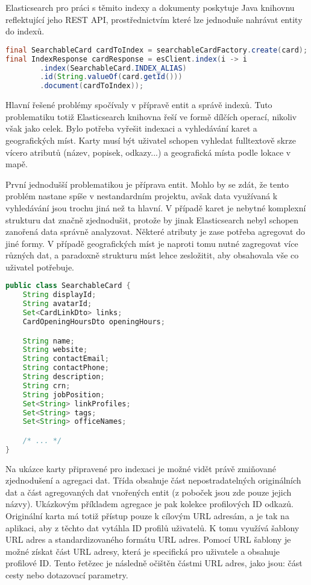 		Elasticsearch pro práci s těmito indexy a dokumenty poskytuje Java knihovnu reflektující jeho \ac{REST} \ac{API},
		prostřednictvím které lze jednoduše nahrávat entity do indexů.

		\begin{lstlisting}[language=Java, caption={Indexace jedné karty do Elasticsearch databáze. Zdroj: [autor]}]
final SearchableCard cardToIndex = searchableCardFactory.create(card);
final IndexResponse cardResponse = esClient.index(i -> i
		.index(SearchableCard.INDEX_ALIAS)
		.id(String.valueOf(card.getId()))
		.document(cardToIndex));
		\end{lstlisting}

		Hlavní řešené problémy spočívaly v přípravě entit a správě indexů.
		Tuto problematiku totiž Elasticsearch knihovna řeší ve formě dílčích operací, nikoliv však jako celek.
		Bylo potřeba vyřešit indexaci a vyhledávání karet a geografických míst.
		Karty musí být uživatel schopen vyhledat fulltextově skrze vícero atributů (název, popisek, odkazy...) a geografická
		místa podle lokace v mapě.

		První jednodušší problematikou je příprava entit.
		Mohlo by se zdát, že tento problém nastane spíše v nestandardním projektu, avšak data využívaná k vyhledávání
		jsou trochu jiná než ta hlavní.
		V případě karet je nebytné komplexní strukturu dat značně zjednodušit, protože by jinak Elasticsearch
		nebyl schopen zanořená data správně analyzovat.
		Některé atributy je zase potřeba agregovat do jiné formy.
		V případě geografických míst je naproti tomu nutné zagregovat více různých dat, a paradoxně strukturu míst lehce
		zesložitit, aby obsahovala vše co uživatel potřebuje.

		\begin{lstlisting}[language=Java, caption={Indexovatelná karta. Obsahuje metadata a vyhledatelná data. Zdroj: [autor]}]
public class SearchableCard {
    String displayId;
    String avatarId;
    Set<CardLinkDto> links;
    CardOpeningHoursDto openingHours;

    String name;
    String website;
    String contactEmail;
    String contactPhone;
    String description;
    String crn;
    String jobPosition;
    Set<String> linkProfiles;
    Set<String> tags;
    Set<String> officeNames;

    /* ... */
}
		\end{lstlisting}

		Na ukázce karty připravené pro indexaci je možné vidět právě zmiňované zjednodušení a agregaci dat.
		Třída obsahuje část nepostradatelných originálních dat a část agregovaných dat vnořených entit (z poboček jsou
		zde pouze jejich názvy).
		Ukázkovým příkladem agregace je pak kolekce profilových ID odkazů.
		Originální karta má totiž přístup pouze k cílovým \ac{URL} adresám, a je tak na aplikaci, aby z těchto dat
		vytáhla ID profilů uživatelů.
		K tomu využívá šablony \ac{URL} adres a standardizovaného formátu \ac{URL} adres.
		Pomocí \ac{URL} šablony je možné získat část \ac{URL} adresy, která je specifická pro uživatele a obsahuje profilové ID.
		Tento řetězec je následně očištěn částmi \ac{URL} adres, jako jsou: část cesty nebo dotazovací parametry.

